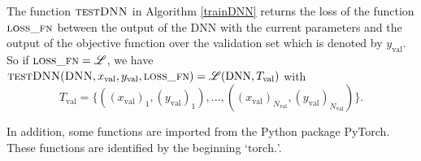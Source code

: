 The function $\textproc{testDNN}$ in Algorithm \ref{trainDNN} returns the loss of the function $\textproc{loss\_fn}$ between the output of the DNN with the current parameters and the output of the objective function over the validation set which is denoted by $y_\mathrm{val}$. So if $\textproc{loss\_fn}=\mathscr{L}$, we have $\textproc{testDNN}(\textproc{DNN}, x_\mathrm{val}, y_\mathrm{val}, \textproc{loss\_fn}) = \mathscr{L}(\mathrm{DNN}, T_\mathrm{val})$ with
\begin{displaymath}
T_\mathrm{val}=\{((x_\mathrm{val})_1,(y_\mathrm{val})_1),\dotsc,((x_\mathrm{val})_{N_\mathrm{val}},(y_\mathrm{val})_{N_\mathrm{val}})\}.
\end{displaymath}

In addition, some functions are imported from the Python package PyTorch. These functions are identified by the beginning `$\mathrm{torch.}$'.

